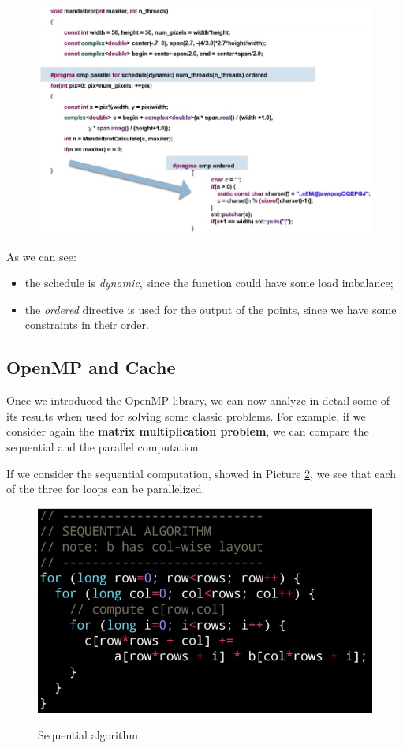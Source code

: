 \begin{figure}[h!]
		\centering
		\includegraphics[scale = 1.6]{img/mandelbrot.jpg}
        \label{mandelbrot}
\end{figure}

As we can see:

\begin{itemize}
    \item the schedule is \textit{dynamic}, since the function could have some load imbalance;
    \item the \textit{ordered} directive is used for the output of the points, since we have some constraints in their order.
\end{itemize}


\subsection{OpenMP and Cache}
Once we introduced the OpenMP library, we can now analyze in detail some of its results when used for solving some classic problems. For example, if we consider again the \textbf{matrix multiplication problem}, we can compare the sequential and the parallel computation.

If we consider the sequential computation, showed in Picture \ref{sequential}, we see that each of the three for loops can be parallelized.

\begin{figure}[h!]
		\centering
		\includegraphics[scale = 1.6]{img/sequential.jpg}
        \label{sequential}
        \caption{Sequential algorithm}
\end{figure}

